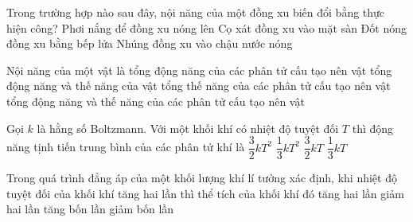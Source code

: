 \begin{ex}
\begin{minipage}[c]{0.24\linewidth}
		\end{minipage}
	\end{ex}

	\begin{ex}%
		Trong trường hợp nào sau đây, nội năng của một đồng xu biến đổi bằng thực hiện công?
		\choice
		{Phơi nắng để đồng xu nóng lên}
		{\True Cọ xát đồng xu vào mặt sàn}
		{Đốt nóng đồng xu bằng bếp lửa}
		{Nhúng đồng xu vào chậu nước nóng}
	\end{ex}

	\begin{ex}%
		Nội năng của một vật là
		\choice
		{tổng động năng của các phân tử cấu tạo nên vật}
		{tổng động năng và thế năng của vật}
		{tổng thế năng của các phân tử cấu tạo nên vật}
		{\True tổng động năng và thế năng của các phân tử cấu tạo nên vật}
	\end{ex}

	\begin{ex}%
		Gọi $k$ là hằng số Boltzmann. Với một khối khí có nhiệt độ tuyệt đối $T$ thì động năng tịnh tiến trung bình của các phân tử khí là
		\choice
		{$\dfrac{3}{2}kT^2$}
		{$\dfrac{1}{3}kT^2$}
		{\True $\dfrac{3}{2}kT$}
		{$\dfrac{1}{3}kT$}
	\end{ex}

	\begin{ex}%
		Trong quá trình đẳng áp của một khối lượng khí lí tưởng xác định, khi nhiệt độ tuyệt đối của khối khí tăng hai lần thì thể tích của khối khí đó
		\choice
		{\True tăng hai lần}
		{giảm hai lần}
		{tăng bốn lần}
		{giảm bốn lần}
	\end{ex}

